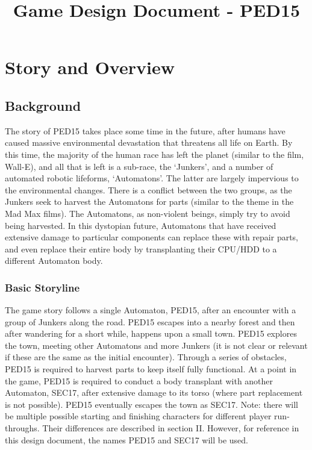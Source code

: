 \documentclass[journal]{IEEEtran}
\begin{document}
\title{Game Design Document - PED15}
{}
\maketitle

\section{Story and Overview}
\subsection{Background}
The story of PED15 takes place some time in the future, after humans have caused massive environmental devastation that threatens all life on Earth. By this time, the majority of the human race has left the planet (similar to the film, Wall-E), and all that is left is a sub-race, the `Junkers', and a number of automated robotic lifeforms, `Automatons'. The latter are largely impervious to the environmental changes. There is a conflict between the two groups, as the Junkers seek to harvest the Automatons for parts (similar to the theme in the Mad Max films). The Automatons, as non-violent beings, simply try to avoid being harvested. In this dystopian future, Automatons that have received extensive damage to particular components can replace these with repair parts, and even replace their entire body by transplanting their CPU/HDD to a different Automaton body.
\subsubsection{Basic Storyline}
The game story follows a single Automaton, PED15, after an encounter with a group of Junkers along the road. PED15 escapes into a nearby forest and then after wandering for a short while, happens upon a small town. PED15 explores the town, meeting other Automatons and more Junkers (it is not clear or relevant if these are the same as the initial encounter). Through a series of obstacles, PED15 is required to harvest parts to keep itself fully functional. At a point in the game, PED15 is required to conduct a body transplant with another Automaton, SEC17, after extensive damage to its torso (where part replacement is not possible). PED15 eventually escapes the town as SEC17.
\linebreak\linebreak
Note: there will be multiple possible starting and finishing characters for different player run-throughs. Their differences are described in section II. However, for reference in this design document, the names PED15 and SEC17 will be used.
\end{document}
